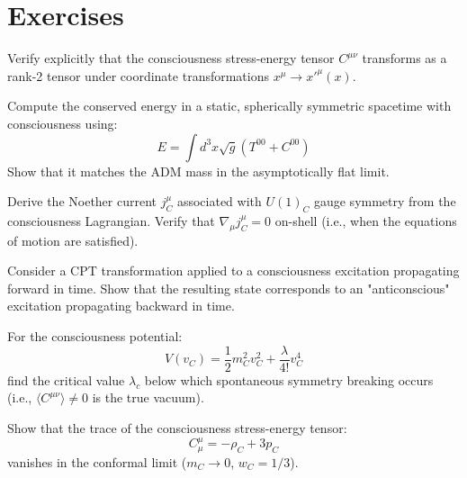 \section{Exercises}

\begin{exercise}
Verify explicitly that the consciousness stress-energy tensor $C^{\mu\nu}$ transforms as a rank-2 tensor under coordinate transformations $x^\mu \to x'^\mu(x)$.
\end{exercise}

\begin{exercise}
Compute the conserved energy in a static, spherically symmetric spacetime with consciousness using:
\begin{equation}
E = \int d^3x \sqrt{g} \left( T^{00} + C^{00} \right)
\end{equation}
Show that it matches the ADM mass in the asymptotically flat limit.
\end{exercise}

\begin{exercise}
Derive the Noether current $j^\mu_C$ associated with $U(1)_C$ gauge symmetry from the consciousness Lagrangian. Verify that $\nabla_\mu j^\mu_C = 0$ on-shell (i.e., when the equations of motion are satisfied).
\end{exercise}

\begin{exercise}
Consider a CPT transformation applied to a consciousness excitation propagating forward in time. Show that the resulting state corresponds to an "anticonscious" excitation propagating backward in time.
\end{exercise}

\begin{exercise}
For the consciousness potential:
\begin{equation}
V(v_C) = \frac{1}{2}m_C^2 v_C^2 + \frac{\lambda}{4!} v_C^4
\end{equation}
find the critical value $\lambda_c$ below which spontaneous symmetry breaking occurs (i.e., $\langle C^{\mu\nu} \rangle \neq 0$ is the true vacuum).
\end{exercise}

\begin{exercise}
Show that the trace of the consciousness stress-energy tensor:
\begin{equation}
C^\mu_\mu = -\rho_C + 3p_C
\end{equation}
vanishes in the conformal limit ($m_C \to 0$, $w_C = 1/3$).
\end{exercise}


